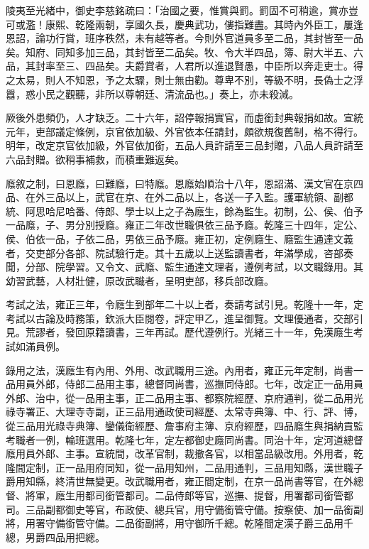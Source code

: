 \begin{pinyinscope}
陵夷至光緒中，御史李慈銘疏曰：「治國之要，惟賞與罰。罰固不可稍逾，賞亦豈可或濫！康熙、乾隆兩朝，享國久長，慶典武功，僂指難盡。其時內外臣工，屢逢恩詔，論功行賞，班序秩然，未有越等者。今則外官道員多至二品，其封皆至一品矣。知府、同知多加三品，其封皆至二品矣。牧、令大半四品，簿、尉大半五、六品，其封率至三、四品矣。夫爵賞者，人君所以進退賢愚，中臣所以奔走吏士。得之太易，則人不知恩，予之太驟，則士無由勸。尊卑不別，等級不明，長偽士之浮囂，惑小民之觀聽，非所以尊朝廷、清流品也。」奏上，亦未殺減。

厥後外患頻仍，人才缺乏。二十六年，詔停報捐實官，而虛銜封典報捐如故。宣統元年，吏部議定條例，京官依加級、外官依本任請封，頗欲規復舊制，格不得行。明年，改定京官依加級，外官依加銜，五品人員許請至三品封贈，八品人員許請至六品封贈。欲稍事補救，而積重難返矣。

廕敘之制，曰恩廕，曰難廕，曰特廕。恩廕始順治十八年，恩詔滿、漢文官在京四品、在外三品以上，武官在京、在外二品以上，各送一子入監。護軍統領、副都統、阿思哈尼哈番、侍郎、學士以上之子為廕生，餘為監生。初制，公、侯、伯予一品廕，子、男分別授廕。雍正二年改世職俱依三品予廕。乾隆三十四年，定公、侯、伯依一品，子依二品，男依三品予廕。雍正初，定例廕生、廕監生通達文義者，交吏部分各部、院試驗行走。其十五歲以上送監讀書者，年滿學成，咨部奏聞，分部、院學習。又令文、武廕、監生通達文理者，遵例考試，以文職錄用。其幼習武藝，人材壯健，原改武職者，呈明吏部，移兵部改廕。

考試之法，雍正三年，令廕生到部年二十以上者，奏請考試引見。乾隆十一年，定考試以古論及時務策，欽派大臣閱卷，評定甲乙，進呈御覽。文理優通者，交部引見。荒謬者，發回原籍讀書，三年再試。歷代遵例行。光緒三十一年，免漢廕生考試如滿員例。

錄用之法，漢廕生有內用、外用、改武職用三途。內用者，雍正元年定制，尚書一品用員外郎，侍郎二品用主事，總督同尚書，巡撫同侍郎。七年，改定正一品用員外郎、治中，從一品用主事，正二品用主事、都察院經歷、京府通判，從二品用光祿寺署正、大理寺寺副，正三品用通政使司經歷、太常寺典簿、中、行、評、博，從三品用光祿寺典簿、鑾儀衛經歷、詹事府主簿、京府經歷，四品廕生與捐納貢監考職者一例，輪班選用。乾隆七年，定左都御史廕同尚書。同治十年，定河道總督廕用員外郎、主事。宣統間，改革官制，裁撤各官，以相當品級改用。外用者，乾隆間定制，正一品用府同知，從一品用知州，二品用通判，三品用知縣，漢世職子爵用知縣，終清世無變更。改武職用者，雍正間定制，在京一品尚書等官，在外總督、將軍，廕生用都司銜管都司。二品侍郎等官，巡撫、提督，用署都司銜管都司。三品副都御史等官，布政使、總兵官，用守備銜管守備。按察使、加一品銜副將，用署守備銜管守備。二品銜副將，用守御所千總。乾隆間定漢子爵三品用千總，男爵四品用把總。


\end{pinyinscope}
